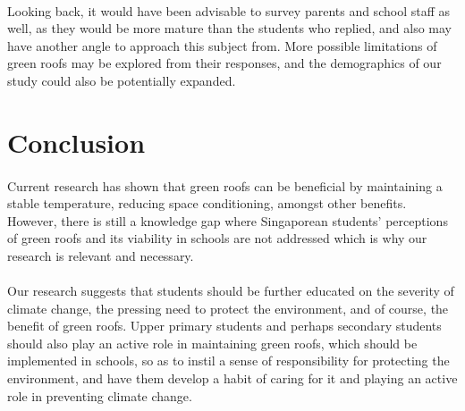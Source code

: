 \documentclass[a4paper]{article}
\begin{document}
\begin{multicols}{2}
  \paragraph{} Looking back, it would have been advisable to survey
  parents and school staff as well, as they would be more mature than the
  students who replied, and also may have another angle to approach this
  subject from. More possible limitations of green roofs may be explored
  from their responses, and the demographics of our study could also be
  potentially expanded.
  \section{Conclusion}
  \paragraph{} Current research has shown that green roofs can be
  beneficial by maintaining a stable temperature, reducing space
  conditioning, amongst other benefits. However, there is still
  a knowledge gap where Singaporean students' perceptions of green
  roofs and its viability in schools are not addressed which is why our
  research is relevant and necessary.

  \paragraph{} Our research suggests that students should be further
  educated on the severity of climate change, the pressing need to protect
  the environment, and of course, the benefit of green roofs. Upper
  primary students and perhaps secondary students should also play an
  active role in maintaining green roofs, which should be implemented
  in schools, so as to instil a sense of responsibility for protecting
  the environment, and have them develop a habit of caring for it and
  playing an active role in preventing climate change.


\end{multicols}

\newpage

\printbibliography[heading=bibintoc,title={References}]

\newpage

\end{document}
